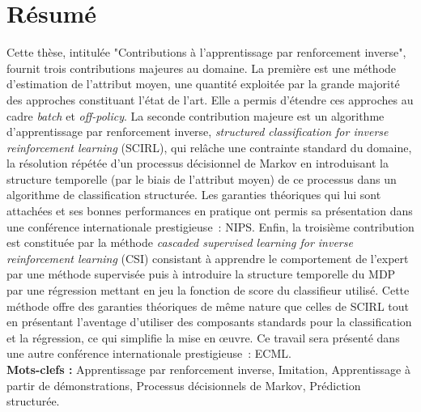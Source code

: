 \documentclass[11pt]{article}
\begin{document}
\section*{Résumé}
Cette thèse, intitulée "Contributions à l'apprentissage par renforcement inverse", fournit trois contributions majeures au domaine.
La première est une méthode d'estimation de l'attribut moyen,
une quantité exploitée par la grande majorité des approches constituant
l'état de l'art. Elle a permis d'étendre ces approches au cadre {\em batch}
et {\em off-policy}.
La seconde contribution majeure est un algorithme d'apprentissage par
renforcement inverse, 
{\em structured classification for inverse reinforcement learning}
(SCIRL), qui relâche une contrainte standard du domaine, la résolution répétée
d'un processus décisionnel de Markov en introduisant la structure temporelle (par le biais de l'attribut moyen) de ce processus dans
un algorithme de classification structurée. 
Les garanties théoriques qui lui sont attachées et ses bonnes performances
en pratique ont permis sa présentation dans une conférence internationale
prestigieuse~: NIPS.
Enfin, la troisième contribution est constituée par la méthode
{\em cascaded supervised learning for inverse reinforcement learning}
(CSI) consistant à apprendre le comportement de l'expert par une méthode supervisée puis à introduire la structure temporelle du MDP par une régression mettant en jeu la fonction de score du classifieur utilisé. Cette méthode offre des garanties théoriques de même nature que celles
de SCIRL tout en présentant l'aventage d'utiliser des composants standards pour la classification et la régression,
ce qui simplifie la mise en \oe uvre. Ce travail sera présenté dans une autre
conférence internationale prestigieuse~: ECML.\\
{\bf Mots-clefs :} Apprentissage par renforcement inverse, Imitation, Apprentissage à partir de démonstrations, Processus décisionnels de Markov, Prédiction structurée.
\end{document}

